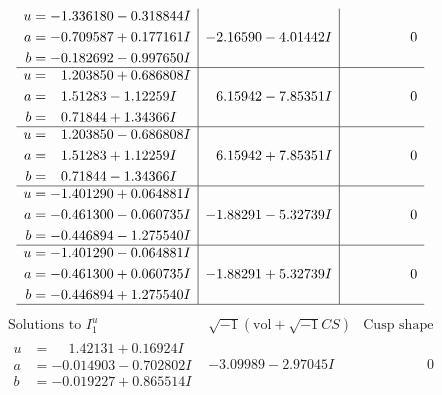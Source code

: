 \documentclass[1p]{elsarticle_modified}
\theoremstyle{definition}
\newcommand{\I}{\sqrt{-1}}
\begin{document}
$$\begin{array}{c|c|c}
\begin{aligned}
u &= -1.336180 - 0.318844 I \\
a &= -0.709587 + 0.177161 I \\
b &= -0.182692 - 0.997650 I\end{aligned}
 & -2.16590 - 4.01442 I & \phantom{-0.000000 } 0 \\ \hline\begin{aligned}
u &= \phantom{-}1.203850 + 0.686808 I \\
a &= \phantom{-}1.51283 - 1.12259 I \\
b &= \phantom{-}0.71844 + 1.34366 I\end{aligned}
 & \phantom{-}6.15942 - 7.85351 I & \phantom{-0.000000 } 0 \\ \hline\begin{aligned}
u &= \phantom{-}1.203850 - 0.686808 I \\
a &= \phantom{-}1.51283 + 1.12259 I \\
b &= \phantom{-}0.71844 - 1.34366 I\end{aligned}
 & \phantom{-}6.15942 + 7.85351 I & \phantom{-0.000000 } 0 \\ \hline\begin{aligned}
u &= -1.401290 + 0.064881 I \\
a &= -0.461300 - 0.060735 I \\
b &= -0.446894 - 1.275540 I\end{aligned}
 & -1.88291 - 5.32739 I & \phantom{-0.000000 } 0 \\ \hline\begin{aligned}
u &= -1.401290 - 0.064881 I \\
a &= -0.461300 + 0.060735 I \\
b &= -0.446894 + 1.275540 I\end{aligned}
 & -1.88291 + 5.32739 I & \phantom{-0.000000 } 0\\
 \hline 
 \end{array}$$\newpage$$\begin{array}{c|c|c}  
\text{Solutions to }I^u_{1}& \I (\text{vol} + \sqrt{-1}CS) & \text{Cusp shape}\\
 \hline 
\begin{aligned}
u &= \phantom{-}1.42131 + 0.16924 I \\
a &= -0.014903 - 0.702802 I \\
b &= -0.019227 + 0.865514 I\end{aligned}
 & -3.09989 - 2.97045 I & \phantom{-0.000000 } 0 \\ \hline\begin{aligned}

\end{aligned}
\end{array}$$
\end{document}

